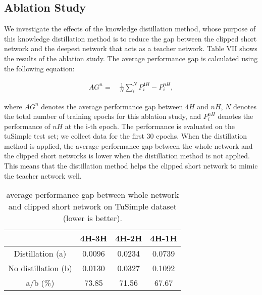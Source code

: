\documentclass[journal]{IEEEtran}
\begin{document}
\subsection{Ablation Study}
We investigate the effects of the knowledge distillation method, whose purpose of this knowledge distillation method is to reduce the gap between the clipped short network and the deepest network that acts as a teacher network. Table VII shows the results of the ablation study. The average performance gap is calculated using the following equation:

\begin{equation}
    \begin{aligned}
        AG^{n} = \, &\frac{1}{N} \sum_{i}^{N}{P^{4H}_{i} - P^{nH}_{i}},
    \end{aligned}
\end{equation}

where $AG^n$ denotes the average performance gap between $4H$ and $nH$, $N$ denotes the total number of training epochs for this ablation study, and $P^{nH}_{i}$ denotes the performance of $nH$ at the i-th epoch. The performance is evaluated on the tuSimple test set; we collect data for the first 30 epochs. When the distillation method is applied, the average performance gap between the whole network and the clipped short networks is lower when the distillation method is not applied. This means that the distillation method helps the clipped short network to mimic the teacher network well. 

\begin{table}[ht]
    \caption{average performance gap between whole network and clipped short network on TuSimple dataset (lower is better).}
    \begin{center}
        \begin{tabular}{|c|c|c|c|}
            \hline
            & 4H-3H & 4H-2H & 4H-1H\\
            \hline
            \hline
            Distillation (a)& 0.0096 & 0.0234 & 0.0739\\
            \hline
            No distillation (b)& 0.0130 & 0.0327 & 0.1092\\
            \hline
            \hline
            a/b (\%)& 73.85 & 71.56 & 67.67\\
            \hline
        \end{tabular}
    \end{center}
\end{table}
\end{document}
